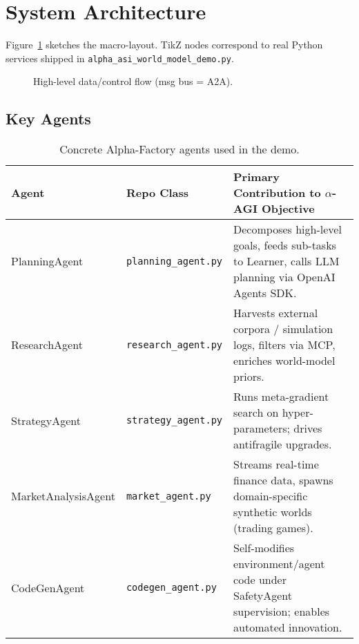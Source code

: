 \documentclass[11pt]{article}
\begin{document}
\section{System Architecture}\label{sec:arch}

Figure~\ref{fig:arch} sketches the macro-layout.
TikZ nodes correspond to real Python services shipped in
\texttt{alpha\_asi\_world\_model\_demo.py}.

\begin{figure}[ht]\centering
{}
\caption{High-level data/control flow (msg bus = A2A).}
\label{fig:arch}\end{figure}

\subsection{Key Agents}

\begin{table}[ht]\centering
\caption{Concrete Alpha-Factory agents used in the demo.}
\label{tab:agents}
\begin{tabular}{@{}llp{8cm}@{}}\toprule
\textbf{Agent} & \textbf{Repo Class} &
\textbf{Primary Contribution to \(\alpha\)-AGI Objective}\\\midrule
PlanningAgent & \texttt{planning\_agent.py} &
Decomposes high-level goals, feeds sub-tasks to Learner, calls LLM planning via OpenAI Agents SDK.\\
ResearchAgent & \texttt{research\_agent.py} &
Harvests external corpora / simulation logs, filters via MCP, enriches world-model priors.\\
StrategyAgent & \texttt{strategy\_agent.py} &
Runs meta-gradient search on hyper-parameters; drives antifragile upgrades.\\
MarketAnalysisAgent & \texttt{market\_agent.py} &
Streams real-time finance data, spawns domain-specific synthetic worlds (trading games).\\
CodeGenAgent & \texttt{codegen\_agent.py} &
Self-modifies environment/agent code under SafetyAgent supervision; enables automated innovation.\\\bottomrule
\end{tabular}\end{table}
\end{document}
